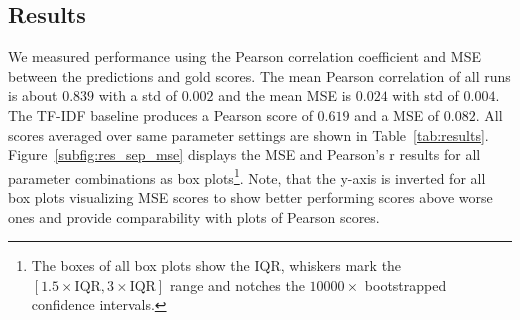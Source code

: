 \subsection{Results}
We measured performance using the Pearson correlation coefficient and \ac{MSE} between the predictions and gold scores. The mean Pearson correlation of all runs is about $0.839$ with a \ac{std} of $0.002$ and the mean \ac{MSE} is $0.024$ with std of $0.004$. The \ac{TF-IDF} baseline produces a Pearson score of $0.619$ and a \ac{MSE} of $0.082$. All scores averaged over same parameter settings are shown in Table~\ref{tab:results}. Figure~\ref{subfig:res_sep_mse} displays the \ac{MSE} and Pearson's r results for all parameter combinations as box plots\footnote{The boxes of all box plots show the \ac{IQR}, whiskers mark the $[1.5\times \text{IQR}, 3\times \text{IQR}]$ range and notches the  $10000\times$ bootstrapped confidence intervals.}. Note, that the y-axis is inverted for all box plots visualizing \ac{MSE} scores to show better performing scores above worse ones and provide comparability with plots of Pearson scores. 



